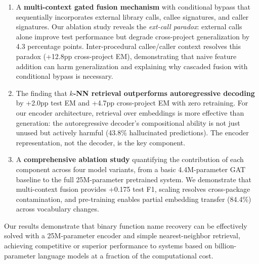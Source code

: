 \documentclass[sigconf,nonacm]{acmart}
\begin{document}
\begin{enumerate}
    \item A \textbf{multi-context gated fusion mechanism} with conditional bypass that sequentially incorporates external library calls, callee signatures, and caller signatures. Our ablation study reveals the \emph{ext-call paradox}: external calls alone improve test performance but degrade cross-project generalization by 4.3 percentage points. Inter-procedural callee/caller context resolves this paradox (+12.8pp cross-project EM), demonstrating that naive feature addition can harm generalization and explaining why cascaded fusion with conditional bypass is necessary.

    \item The finding that \textbf{$k$-NN retrieval outperforms autoregressive decoding} by +2.0pp test EM and +4.7pp cross-project EM with zero retraining. For our encoder architecture, retrieval over embeddings is more effective than generation: the autoregressive decoder's compositional ability is not just unused but actively harmful (43.8\% hallucinated predictions). The encoder representation, not the decoder, is the key component.

    \item A \textbf{comprehensive ablation study} quantifying the contribution of each component across four model variants, from a basic 4.4M-parameter GAT baseline to the full 25M-parameter pretrained system. We demonstrate that multi-context fusion provides +0.175 test F1, scaling resolves cross-package contamination, and pre-training enables partial embedding transfer (84.4\%) across vocabulary changes.
\end{enumerate}

Our results demonstrate that binary function name recovery can be effectively solved with a 25M-parameter encoder and simple nearest-neighbor retrieval, achieving competitive or superior performance to systems based on billion-parameter language models at a fraction of the computational cost.

\end{document}
